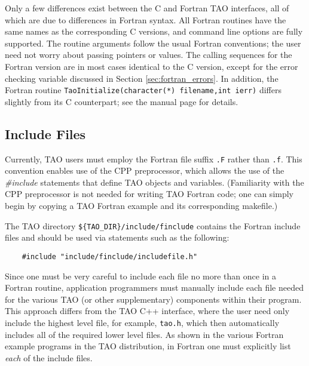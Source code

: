 Only a few differences exist between the C and Fortran TAO interfaces,
all of which are due to differences in Fortran syntax.  All Fortran
routines have the same names as the corresponding C versions, and
command line options are fully supported. The routine arguments follow
the usual Fortran conventions; the user need not worry about passing
pointers or values.  The calling sequences for the Fortran version are
in most cases identical to the C version, except for the error
checking variable discussed in Section \ref{sec:fortran_errors}.  In
addition, the Fortran routine {\tt TaoInitialize(character(*) filename,int ierr)}
differs slightly from its C counterpart; see the manual page for
details.


\subsection{Include Files}
\label{sec:fortran_includes}


Currently, TAO users must employ the Fortran file suffix {\tt .F}
rather than {\tt .f}.  This convention enables use of the CPP
preprocessor, which allows the use of the {\em \#include} statements
that define TAO objects and variables. (Familiarity with the CPP
preprocessor is not needed for writing TAO Fortran code; one can
simply begin by copying a TAO Fortran example and its corresponding
makefile.)  

The TAO directory {\tt \$\{TAO\_DIR\}/include/finclude}
contains the Fortran include files
and should be used via statements 
such as the following:
\begin{verbatim}
    #include "include/finclude/includefile.h"
\end{verbatim}
\noindent
Since one must be very careful to include each file no more than once
in a Fortran routine, application programmers must manually include
each file needed for the various TAO (or other supplementary)
components within their program.  This approach differs from the TAO
C++ interface, where the user need only include the highest level
file, for example, {\tt tao.h}, which then automatically
includes all of the required lower level files.  As shown in the
various Fortran example programs in the TAO distribution, in Fortran
one must explicitly list {\em each} of the include files.


